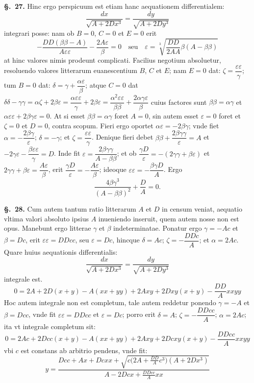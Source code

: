 \documentclass{article}
\begin{document}
\textbf{§.~27.} Hinc ergo perspicuum est etiam hanc aequationem differentialem:
\[ \frac{dx}{\sqrt{A + 2Dx^{3}}} = \frac{dy}{\sqrt{A + 2Dy^{3}}} \]
integrari posse: nam ob $B = 0$, $C = 0$ et $E = 0$ erit
\[ -\frac{DD(\beta\beta - A)}{A\varepsilon\varepsilon} - \frac{2A\varepsilon}{\beta} = 0 \quad\text{seu}\quad
   \varepsilon = \sqrt[3]{\frac{DD}{2AA}\beta(A - \beta\beta)} \]
at hinc valores nimis prodeunt complicati. Facilius negotium absoluetur, resoluendo valores
litterarum euanescentium $B$, $C$ et $E$; nam $E = 0$ dat: $\zeta = \dfrac{\varepsilon\varepsilon}{\gamma}$;
tum $B = 0$ dat: $\delta = \gamma + \dfrac{\alpha\varepsilon}{\beta}$; atque $C = 0$ dat
$\delta\delta - \gamma\gamma = \alpha\zeta + 2\beta\varepsilon = \dfrac{\alpha\varepsilon\varepsilon}{\gamma} + 2\beta\varepsilon
= \dfrac{\alpha^{2}\varepsilon\varepsilon}{\beta\beta} + \dfrac{2\alpha\gamma\varepsilon}{\beta}$ cuius factores sunt
$\beta\beta = \alpha\gamma$ et $\alpha\varepsilon\varepsilon + 2\beta\gamma\varepsilon = 0$. At si esset
$\beta\beta = \alpha\gamma$ foret $A = 0$, sin autem esset $\varepsilon = 0$ foret et $\zeta = 0$ et
$D = 0$, contra scopum. Fieri ergo oportet $\alpha\varepsilon = -2\beta\gamma$; vnde fiet
$\alpha = -\dfrac{2\beta\gamma}{\varepsilon}$; $\delta = -\gamma$; et $\zeta = \dfrac{\varepsilon\varepsilon}{\gamma}$.
Denique fieri debet $\beta\beta + \dfrac{2\beta\gamma\gamma}{\varepsilon} = A$ et
$-2\gamma\varepsilon - \dfrac{\beta\varepsilon\varepsilon}{\gamma} = D$. Inde fit
$\varepsilon = \dfrac{2\beta\gamma\gamma}{A - \beta\beta}$; et ob
$\dfrac{\gamma D}{\varepsilon} = -(2\gamma\gamma + \beta\varepsilon)$ et $2\gamma\gamma + \beta\varepsilon = \dfrac{A\varepsilon}{\beta}$,
erit $\dfrac{\gamma D}{\varepsilon} = -\dfrac{A\varepsilon}{\beta}$; ideoque $\varepsilon\varepsilon = -\dfrac{\beta\gamma D}{A}$. Ergo
\[ \frac{4\beta\gamma^{3}}{(A - \beta\beta)^{2}} + \frac{D}{A} = 0. \]

\textbf{§.~28.} Cum autem tantum ratio litterarum $A$ et $D$ in censum veniat, aequatio vltima
valori absoluto ipsius $A$ inueniendo inseruit, quem autem nosse non est opus. Manebunt ergo
litterae $\gamma$ et $\beta$ indeterminatae. Ponatur ergo $\gamma = -Ac$ et $\beta = Dc$, erit
$\varepsilon\varepsilon = DDcc$, seu $\varepsilon = Dc$, hincque $\delta = Ac$;
$\zeta = -\dfrac{DDc}{A}$; et $\alpha = 2Ac$. Quare huius aequationis differentialis:
\[ \frac{dx}{\sqrt{A + 2Dx^{3}}} = \frac{dy}{\sqrt{A + 2Dy^{3}}} \]
integrale est.
\[ 0 = 2A + 2D(x+y) - A(xx+yy) + 2Axy + 2Dxy(x+y) - \frac{DD}{A}xxyy \]
Hoc autem integrale non est completum, tale autem reddetur ponendo $\gamma = -A$ et $\beta = Dcc$,
vnde fit $\varepsilon\varepsilon = DDcc$ et $\varepsilon = Dc$; porro erit $\delta = A$;
$\zeta = -\dfrac{DDcc}{A}$; $\alpha = 2Ac$; ita vt integrale completum sit:
\[ 0 = 2Ac + 2Dcc(x+y) - A(xx+yy) + 2Axy + 2Dcxy(x+y) - \frac{DDcc}{A}xxyy \]
vbi $c$ est constans ab arbitrio pendens, vnde fit:
\[ y = \frac{Dcc + Ax + Dcxx + \sqrt{c\bigl(2A + \frac{DD}{A}c^{3}\bigr)(A + 2Dx^{3})}}{A - 2Dcx + \frac{DDcc}{A}xx} \]
\end{document}
